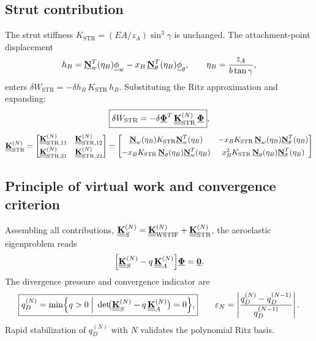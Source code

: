 \subsection*{Strut contribution}

The strut stiffness $K_{\mathrm{STR}} = (EA/z_A)\sin^3\gamma$ is unchanged. The attachment-point displacement
\begin{equation}
h_B = \underline{\mathbf{N}}_w^T(\eta_B)\underline{\mathbf{\phi}}_w - x_B\,\underline{\mathbf{N}}_\theta^T(\eta_B)\underline{\mathbf{\phi}}_\theta, \qquad \eta_B = \frac{z_A}{b\tan\gamma},
\end{equation}
enters $\delta W_{\mathrm{STR}} = -\delta h_B\,K_{\mathrm{STR}}\,h_B$. Substituting the Ritz approximation and expanding:
\begin{equation}
\boxed{\delta W_{\mathrm{STR}} = -\delta\underline{\mathbf{\Phi}}^T\,\underline{\underline{\mathbf{K}}}_{\mathrm{STR}}^{(N)}\,\underline{\mathbf{\Phi}}}, 
\end{equation}
\begin{equation}
\underline{\underline{\mathbf{K}}}_{\mathrm{STR}}^{(N)} 
= \begin{bmatrix}
\underline{\underline{\mathbf{K}}}_{\mathrm{STR},11}^{(N)}& \underline{\underline{\mathbf{K}}}_{\mathrm{STR},12}^{(N)} \\[4pt]
\underline{\underline{\mathbf{K}}}_{\mathrm{STR},21}^{(N)} & \underline{\underline{\mathbf{K}}}_{\mathrm{STR},22}^{(N)}
\end{bmatrix}
= 
\begin{bmatrix}
\underline{\mathbf{N}}_w(\eta_B)K_{\mathrm{STR}}\underline{\mathbf{N}}_w^T(\eta_B) & -x_B K_{\mathrm{STR}}\,\underline{\mathbf{N}}_w(\eta_B)\underline{\mathbf{N}}_\theta^T(\eta_B) \\[4pt]
-x_B K_{\mathrm{STR}}\,\underline{\mathbf{N}}_\theta(\eta_B)\underline{\mathbf{N}}_w^T(\eta_B) & x_B^2 K_{\mathrm{STR}}\,\underline{\mathbf{N}}_\theta(\eta_B)\underline{\mathbf{N}}_\theta^T(\eta_B)
\end{bmatrix}
\end{equation}

\subsection*{Principle of virtual work and convergence criterion}

Assembling all contributions, $\underline{\underline{\mathbf{K}}}_S^{(N)} = \underline{\underline{\mathbf{K}}}_{\mathrm{WSTIF}}^{(N)} + \underline{\underline{\mathbf{K}}}_{\mathrm{STR}}^{(N)}$, the aeroelastic eigenproblem reads
\begin{equation}
\Bigl[\underline{\underline{\mathbf{K}}}_S^{(N)} - q\,\underline{\underline{\mathbf{K}}}_A^{(N)}\Bigr]\underline{\mathbf{\Phi}} = \underline{\mathbf{0}}.
\end{equation}
The divergence pressure and convergence indicator are
\begin{equation}
\boxed{q_D^{(N)} = \min\Bigl\{q>0\;\Big|\;\det\!\bigl(\underline{\underline{\mathbf{K}}}_S^{(N)}-q\,\underline{\underline{\mathbf{K}}}_A^{(N)}\bigr)=0\Bigr\},}
\qquad
\varepsilon_N = \left|\frac{q_D^{(N)}-q_D^{(N-1)}}{q_D^{(N-1)}}\right|.
\end{equation}
Rapid stabilization of $q_D^{(N)}$ with $N$ validates the polynomial Ritz basis.